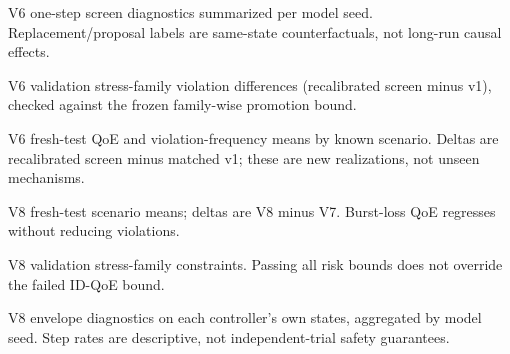 \documentclass[10pt]{article}
\providecommand{\actioncalpath}{generated-action-calibration-v6}
\providecommand{\budgetshieldpath}{generated-budget-shield-v8}
\begin{document}
\begin{table}[p]
\centering\resizebox{\textwidth}{!}{}
\caption{V6 one-step screen diagnostics summarized per model seed. Replacement/proposal labels are same-state counterfactuals, not long-run causal effects.}
\label{tab:v6-screen-diagnostics}
\end{table}

\begin{table}[p]
\centering\resizebox{\textwidth}{!}{}
\caption{V6 validation stress-family violation differences (recalibrated screen minus v1), checked against the frozen family-wise promotion bound.}
\label{tab:v6-families}
\end{table}

\begin{table}[p]
\centering\resizebox{\textwidth}{!}{}
\caption{V6 fresh-test QoE and violation-frequency means by known scenario. Deltas are recalibrated screen minus matched v1; these are new realizations, not unseen mechanisms.}
\label{tab:v6-scenarios}
\end{table}

\begin{table}[p]
\centering\resizebox{\textwidth}{!}{}
\caption{V8 fresh-test scenario means; deltas are V8 minus V7. Burst-loss QoE regresses without reducing violations.}
\label{tab:v8-scenarios}
\end{table}

\begin{table}[p]
\centering\resizebox{\textwidth}{!}{}
\caption{V8 validation stress-family constraints. Passing all risk bounds does not override the failed ID-QoE bound.}
\label{tab:v8-families}
\end{table}

\begin{table}[p]
\centering\resizebox{\textwidth}{!}{}
\caption{V8 envelope diagnostics on each controller's own states, aggregated by model seed. Step rates are descriptive, not independent-trial safety guarantees.}
\label{tab:v8-diagnostics}
\end{table}
\end{document}
